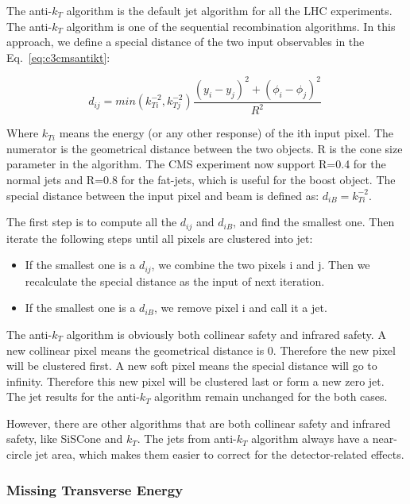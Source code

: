 The anti-$k_{T}$ algorithm\cite{Cacciari:2008gp} is the default jet algorithm for all the LHC experiments. The anti-$k_{T}$ algorithm is one of the sequential recombination algorithms. In this approach, we define a special distance of the two input observables in the Eq.~\ref{eq:c3cmsantikt}:

\begin{equation}
 d_{ij} = min(k_{Ti}^{-2},k_{Tj}^{-2})\frac{(y_{i}-y_{j})^{2}+(\phi_{i}-\phi_{j})^{2}}{R^{2}} \;
 \label{eq:c3cmsantikt}
\end{equation}

Where $k_{Ti}$ means the energy (or any other response) of the ith input pixel. The numerator is the geometrical distance between the two objects. R is the cone size parameter in the algorithm. The CMS experiment now support R=0.4 for the normal jets and R=0.8 for the fat-jets, which is useful for the boost object. The special distance between the input pixel and beam is defined as: $d_{iB} = k_{Ti}^{-2}$.

The first step is to compute all the $d_{ij}$ and $d_{iB}$, and find the smallest one. Then iterate the following steps until all pixels are clustered into jet: 

\begin{itemize}
  \item If the smallest one is a $d_{ij}$, we combine the two pixels i and j. Then we recalculate the special distance as the input of next iteration.
  \item If the smallest one is a $d_{iB}$, we remove pixel i and call it a jet.
\end{itemize}

The anti-$k_{T}$ algorithm is obviously both collinear safety and infrared safety. A new collinear pixel means the geometrical distance is 0. Therefore the new pixel will be clustered first. A new soft pixel means the special distance will go to infinity. Therefore this new pixel will be clustered last or form a new zero jet. The jet results for the anti-$k_{T}$ algorithm remain unchanged for the both cases. 

However, there are other algorithms that are both collinear safety and infrared safety, like SiSCone\cite{Salam:2007xv} and $k_{T}$\cite{Cacciari:2005hq}. The jets from anti-$k_{T}$ algorithm always have a near-circle jet area\cite{Cacciari:2008gn}, which makes them easier to correct for the detector-related effects.

\subsubsection{Missing Transverse Energy}

